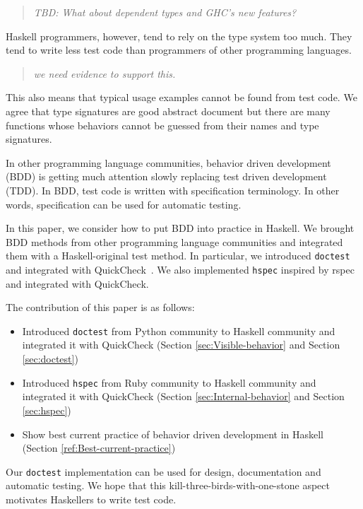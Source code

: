 \documentclass[preprint]{sigplanconf}
\begin{document}
\begin{quote}
    \emph{TBD: What about dependent types and GHC's new features?}
\end{quote}

Haskell programmers, however, tend to rely on the type system too much.  They
tend to write less test code than programmers of other programming languages.

\begin{quote}
    \emph{we need evidence to support this.}
\end{quote}

This also means that typical usage examples cannot be found from test code.
We agree that type signatures are good abstract document but
there are many functions whose behaviors cannot be guessed from
their names and type signatures.

In other programming language communities,
behavior driven development (BDD) is getting much attention
slowly replacing test driven development (TDD).
In BDD, test code is written with specification terminology.
In other words, specification can be used for automatic testing.

In this paper, we consider how to put BDD into practice in Haskell.
We brought BDD methods from other programming language communities and
integrated them with a Haskell-original test method.
In particular, we introduced {\tt doctest}~\cite{doctest} and
integrated with QuickCheck~\cite{quickcheck}.
We also implemented {\tt hspec} inspired by rspec~\cite{rspec}
and integrated with QuickCheck.

The contribution of this paper is as follows:

\begin{itemize}
\item Introduced {\tt doctest} from Python community to Haskell community
and integrated it with QuickCheck
(Section \ref{sec:Visible-behavior} and Section \ref{sec:doctest})
\item Introduced {\tt hspec} from Ruby community to Haskell community and
integrated it with QuickCheck
(Section \ref{sec:Internal-behavior} and Section \ref{sec:hspec})
\item Show best current practice of behavior driven development in Haskell (Section \ref{ref:Best-current-practice})
\end{itemize}

\noindent Our {\tt doctest} implementation
can be used for design, documentation and automatic testing.
We hope that this kill-three-birds-with-one-stone aspect
motivates Haskellers to write test code.
\end{document}
